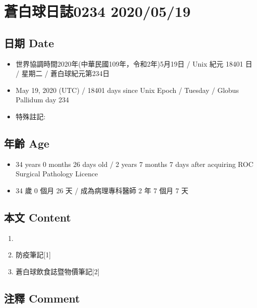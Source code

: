 \documentclass[
]{article}
\providecommand{\tightlist}{%
  \setlength{\itemsep}{0pt}\setlength{\parskip}{0pt}}
\begin{document}
\hypertarget{ux84bcux767dux7403ux65e5ux8a8c0234-20200519}{%
\section{蒼白球日誌0234
2020/05/19}\label{ux84bcux767dux7403ux65e5ux8a8c0234-20200519}}

\hypertarget{ux65e5ux671f-date-18}{%
\subsection{日期 Date}\label{ux65e5ux671f-date-18}}

\begin{itemize}
\tightlist
\item
  世界協調時間2020年(中華民國109年，令和2年)5月19日 / Unix 紀元 18401 日
  / 星期二 / 蒼白球紀元第234日
\item
  May 19, 2020 (UTC) / 18401 days since Unix Epoch / Tuesday / Globus
  Pallidum day 234
\item
  特殊註記:
\end{itemize}

\hypertarget{ux5e74ux9f61-age-18}{%
\subsection{年齡 Age}\label{ux5e74ux9f61-age-18}}

\begin{itemize}
\tightlist
\item
  34 years 0 months 26 days old / 2 years 7 months 7 days after
  acquiring ROC Surgical Pathology Licence
\item
  34 歲 0 個月 26 天 / 成為病理專科醫師 2 年 7 個月 7 天
\end{itemize}

\hypertarget{ux672cux6587-content-18}{%
\subsection{本文 Content}\label{ux672cux6587-content-18}}

\begin{enumerate}
\def\labelenumi{\arabic{enumi}.}
\item
\item
  防疫筆記{[}1{]}
\item
  蒼白球飲食誌暨物價筆記{[}2{]}
\end{enumerate}

\hypertarget{ux6ce8ux91cb-comment-18}{%
\subsection{注釋 Comment}\label{ux6ce8ux91cb-comment-18}}
\end{document}
